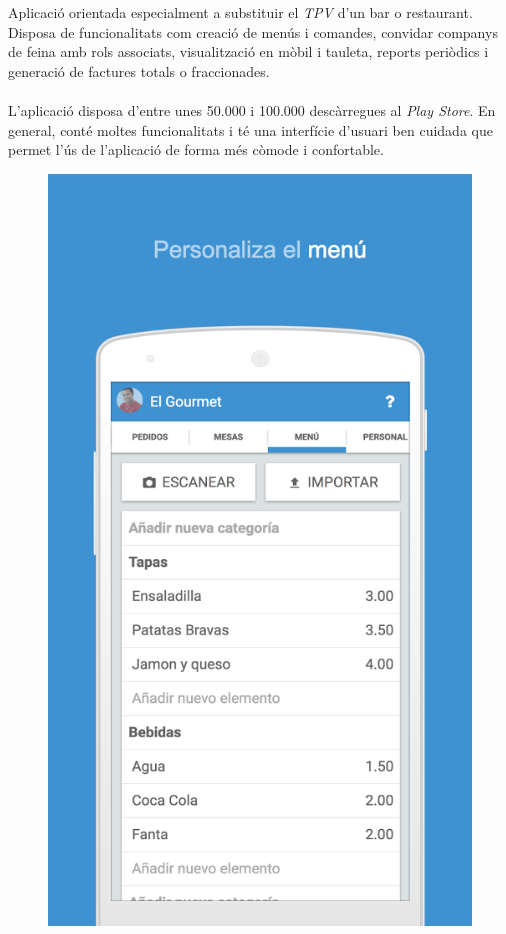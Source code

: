 Aplicació\cite{waiterio} orientada especialment a substituir el \textit{TPV} d'un bar o restaurant. Disposa de funcionalitats com creació de menús i comandes, convidar companys de feina amb rols associats, visualització en mòbil i tauleta, reports periòdics i generació de factures totals o fraccionades.
\\\\
L'aplicació disposa d'entre unes 50.000 i 100.000 descàrregues al \textit{Play Store}. En general, conté moltes funcionalitats i té una interfície d'usuari ben cuidada que permet l'ús de l'aplicació de forma més còmode i confortable.
\\
\begin{figure}[H]
\centering
\includegraphics[scale=0.20]{Figures/waitero-1.png}

\end{figure}
